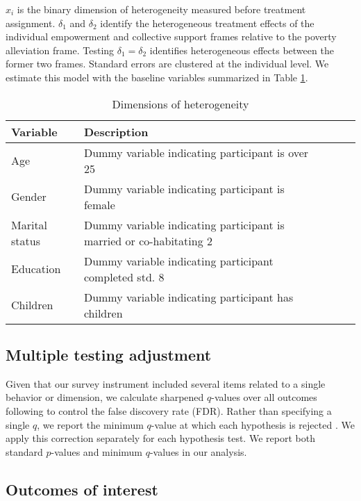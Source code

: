 \documentclass[11pt, a4paper]{article}\usepackage[]{graphicx}\usepackage[]{color}
\begin{document}
        $x_{i}$ is the binary dimension of heterogeneity measured before treatment assignment. $\delta_{1}$ and $\delta_{2}$ identify the heterogeneous treatment effects of the individual empowerment and collective support frames relative to the poverty alleviation frame. Testing $\delta_{1} = \delta_{2}$ identifies heterogeneous effects between the former two frames. Standard errors are clustered at the individual level. We estimate this model with the baseline variables summarized in Table \ref{tab:hetvars}.

        \begin{table}[h]
        \centering
        \caption{Dimensions of heterogeneity}
        \label{tab:hetvars}
        \begin{tabular}{@{}lllll@{}}
        \toprule
        Variable                                     & Description                                          &  &  &  \\ \midrule
        Age & Dummy variable indicating participant is over 25 &  &  &  \\
        Gender & Dummy variable indicating participant is female &  &  &  \\
        Marital status & Dummy variable indicating participant is married or co-habitating 2 &  &  &  \\
        Education & Dummy variable indicating participant completed std. 8 &  &  &  \\
        Children & Dummy variable indicating participant has children &  &  &  \\ \bottomrule
        \end{tabular}
        \end{table}

    \subsection{Multiple testing adjustment}

        Given that our survey instrument included several items related to a single behavior or dimension, we calculate sharpened $q$-values over all outcomes following \textcite{benjamini_adaptive_2006} to control the false discovery rate (FDR). Rather than specifying a single $q$, we report the minimum $q$-value at which each hypothesis is rejected \parencite{anderson_multiple_2008}. We apply this correction separately for each hypothesis test. We report both standard $p$-values and minimum $q$-values in our analysis.

    \subsection{Outcomes of interest}
\end{document}

